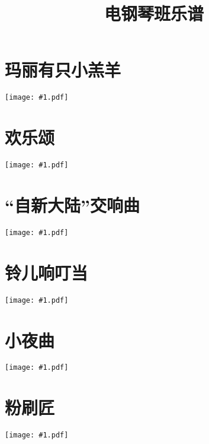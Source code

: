 \documentclass[a4paper,12pt,fontset=none]{ctexart}
\title{\bfseries 电钢琴班乐谱}
\author{}
\date{}
\newcommand{\includescore}[1]{\begin{center}\texttt{[image: \#1.pdf]}\end{center}}
\begin{document}
\pagestyle{plain}

\maketitle

\thispagestyle{plain}

\section{玛丽有只小羔羊}

\includescore{mary-had-a-little-lamb}

\section{欢乐颂}

\includescore{ode-to-joy}

\section{“自新大陆”交响曲}

\includescore{from-the-new-world}

\section{铃儿响叮当}

\includescore{jingle-bells}

\section{小夜曲}

\includescore{serenade}

\section{粉刷匠}

\includescore{painter}
\end{document}
